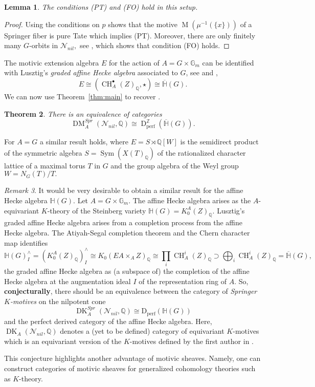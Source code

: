 \documentclass{amsart}
\theoremstyle{plain}
\newtheorem{theorem}{Theorem}[section]
\newtheorem{lemma}[theorem]{Lemma}
\theoremstyle{TheoremNum}
\theoremstyle{definition}
\theoremstyle{remark}
\newtheorem{remark}[theorem]{Remark}
\numberwithin{equation}{section}
\newcommand{\Q}{\mathbb{Q}}
\newcommand{\Z}{\mathbb{Z}}
\newcommand{\Nnil}{\mathcal{N}_{nil}}
\newcommand{\Chow}{\operatorname{CH}}
\newcommand{\Mot}{\operatorname{M}}
\newcommand{\DM}{\operatorname{DM}}
\newcommand{\Dperf}{\operatorname{D_{perf}}}
\newcommand{\DperfZ}{\operatorname{D}^\Z_{\operatorname{perf}}}
\begin{document}
\begin{lemma}
The conditions (PT) and (FO) hold in this setup.
\end{lemma}
\begin{proof}
Using the conditions on $p$ 
\cite[Theorem 1.1]{eberhardt_springer_2021} shows that the motive $\Mot(\mu^{-1}(\{x\}))$ of a Springer fiber is pure Tate which implies (PT). Moreover, there are only finitely many $G$-orbits in $\Nnil,$ see \cite{carter_finite_1993}, which shows that condition (FO) holds.
\end{proof}

The motivic extension algebra $E$ for the action of $A=G\times\mathbb{G}_m$ can be identified with Lusztig's \emph{graded affine Hecke algebra} associated to $G$, see \cite{lusztig_cuspidal_1988} and \cite{lusztig_affine_1989},
$$E\cong(\Chow_{A}^\bullet(Z)_\Q,\star)\cong\overline{\mathbb{H}}(G).$$
We can now use Theorem~\ref{thm:main} to recover \cite[Corollary 1.4]{eberhardt_springer_2021}.
\begin{theorem}\label{thm:heckealgebra}
There is an equivalence of categories
$$\DM^{Spr}_{A}(\Nnil,\Q)\cong \DperfZ(\overline{\mathbb{H}}(G)).$$
\end{theorem}
For $A=G$ a similar result holds, where $E=S\rtimes\Q[W]$ is the semidirect product of the symmetric algebra $S=\operatorname{Sym}(X(T)_\Q)$ of the rationalized character lattice of a maximal torus $T$ in $G$ and the group algebra of the Weyl group $W=N_G(T)/T.$

\begin{remark}
It would be very desirable to obtain a similar result for the affine Hecke algebra $\mathbb{H}(G).$ Let $A=G\times\mathbb{G}_m.$ The affine Hecke algebra arises as the $A$-equivariant $K$-theory of the Steinberg variety
$\mathbb{H}(G)=K_0^{A}(Z)_\Q.$
Lusztig's graded affine Hecke algebra arises from a completion process from the affine Hecke algebra. 
The Atiyah-Segal completion theorem and the Chern character map identifies
$$\mathbb{H}(G)_I^{\wedge}=(K_0^{A}(Z)_\Q)_I^{\wedge}\cong K_0(EA\times_{A}Z)_\Q\cong\prod_i\Chow^i_{A}(Z)_\Q\supset \bigoplus_i\Chow^i_{A}(Z)_\Q=\overline{\mathbb{H}}(G),$$
the graded affine Hecke algebra as (a subspace of) the completion of the affine Hecke algebra at the augmentation ideal $I$ of the representation ring of $A.$ So, \textbf{conjecturally}, there should be an equivalence between the category of \emph{Springer $K$-motives} on the nilpotent cone
$$\operatorname{DK}^{Spr}_A(\Nnil,\Q)\cong \Dperf(\mathbb{H}(G))$$
and the perfect derived category of the affine Hecke algebra. Here, $\operatorname{DK}_A(\Nnil,\Q)$ denotes a (yet to be defined) category of equivariant $K$-motives which is an equivariant version of the $K$-motives defined by the first author in \cite{eberhardt_k-motives_2019}.

This conjecture highlights another advantage of motivic sheaves. Namely, one can construct categories of motivic sheaves for generalized cohomology theories such as $K$-theory.
\end{remark}
\end{document}
